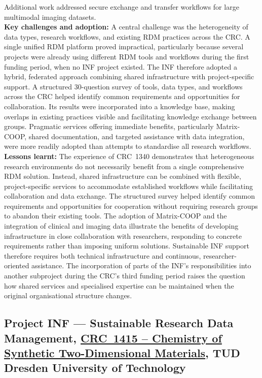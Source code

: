\documentclass{eceasst}
\begin{document}
Additional work addressed secure exchange and transfer
workflows for large multimodal imaging datasets.
\\
\noindent\textbf{Key challenges and adoption:}
A central challenge was the heterogeneity of data types,
research workflows, and existing RDM practices across
the CRC. A single unified RDM platform proved impractical,
particularly because several projects were already
using different RDM tools and workflows during the
first funding period, when no INF project existed.
The INF therefore adopted a hybrid, federated approach
combining shared infrastructure with project-specific
support. A structured 30-question survey of tools, data types, and
workflows across the CRC helped identify common requirements
and opportunities for collaboration.
Its results were incorporated into a knowledge base, making
overlaps in existing practices visible and facilitating
knowledge exchange between groups.
Pragmatic services offering immediate benefits, particularly
Matrix-COOP, shared documentation, and targeted assistance
with data integration, were more readily adopted than
attempts to standardise all research workflows.
\\
\noindent\textbf{Lessons learnt:}
The experience of CRC~1340 demonstrates that heterogeneous
research environments do not necessarily benefit from a
single comprehensive RDM solution.
Instead, shared infrastructure can be combined with
flexible, project-specific services to accommodate
established workflows while facilitating collaboration
and data exchange.
The structured survey helped identify common requirements
and opportunities for cooperation without requiring
research groups to abandon their existing tools.
The adoption of Matrix-COOP and the integration of clinical
and imaging data illustrate the benefits of developing
infrastructure in close collaboration with researchers,
responding to concrete requirements rather than imposing
uniform solutions. Sustainable INF support therefore
requires both technical infrastructure and continuous,
researcher-oriented assistance.
The incorporation of parts of the INF's responsibilities
into another subproject during the CRC's third funding
period raises the question how shared services
and specialised expertise can be maintained when the
original organisational structure changes.


\subsection{Project INF --- Sustainable Research Data Management,
\href{https://gepris.dfg.de/gepris/projekt/417590517?language=en}
{CRC~1415 -- Chemistry of Synthetic Two-Dimensional Materials},
TUD Dresden University of Technology}
\label{subsec:crc1415}
\end{document}
